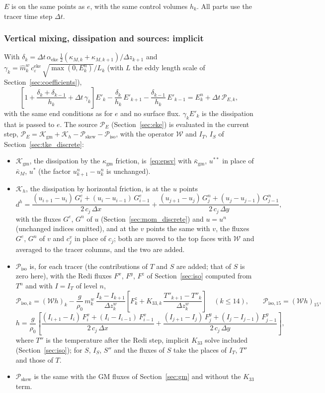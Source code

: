 \documentclass{article}
\begin{document}
$E$ is on the same points as $e$, with the same control volumes $h_k$. All parts use the tracer time step $\Delta t$.

\subsubsection*{Vertical mixing, dissipation and sources: implicit}
With $\delta_k = \Delta t\,\alpha_\text{eke}\,\tfrac12(\kappa_{M,k} + \kappa_{M,k+1})/\Delta z_{k+1}$ and $\gamma_k = \hat m^w_k\,c^\text{eke}_\varepsilon\,\sqrt{\max(0, E^n_k)}/L_k$ (with $L$ the eddy length scale of Section~\ref{sec:coefficients}),
\[
\left[ 1 + \frac{\delta_k + \delta_{k-1}}{h_k} + \Delta t\,\gamma_k \right] E'_k - \frac{\delta_k}{h_k}\,E'_{k+1} - \frac{\delta_{k-1}}{h_k}\,E'_{k-1}
= E^n_k + \Delta t\,\mathcal{P}_{E,k},
\]
with the same end conditions as for $e$ and no surface flux.
$\gamma_k E'_k$ is the dissipation that is passed to $e$.
The source $\mathcal{P}_E$ (Section~\ref{sec:eke}) is evaluated in the current step, $\mathcal{P}_E = \mathcal{K}_\text{gm} + \mathcal{K}_h - \mathcal{P}_\text{skew} - \mathcal{P}_\text{iso}$, with the operator $\mathcal{W}$ and $I_T$, $I_S$ of Section~\ref{sec:tke_discrete}:
\begin{itemize}
\item $\mathcal{K}_\text{gm}$, the dissipation by the $\kappa_\text{gm}$ friction, is~\eqref{eq:epsv} with $\bar\kappa_\text{gm}$, $u^{\ast\ast}$ in place of $\bar\kappa_M$, $u^\ast$ (the factor $u^n_{k+1}-u^n_k$ is unchanged).
\item $\mathcal{K}_h$, the dissipation by horizontal friction, is at the $u$ points
\[
d^h = \frac{(u_{i+1}-u_i)\,G^e_i + (u_i-u_{i-1})\,G^e_{i-1}}{2\,c_j\,\Delta x} + \frac{(u_{j+1}-u_j)\,G^n_j + (u_j-u_{j-1})\,G^n_{j-1}}{2\,c_j\,\Delta y},
\]
with the fluxes $G^e$, $G^n$ of $u$ (Section~\ref{sec:mom_discrete}) and $u = u^n$ (unchanged indices omitted), and at the $v$ points the same with $v$, the fluxes $G^e$, $G^n$ of $v$ and $c^v_j$ in place of $c_j$; both are moved to the top faces with $\mathcal{W}$ and averaged to the tracer columns, and the two are added.
\item $\mathcal{P}_\text{iso}$ is, for each tracer (the contributions of $T$ and $S$ are added; that of $S$ is zero here), with the Redi fluxes $F^x$, $F^y$, $F^z$ of Section~\ref{sec:iso} computed from $T^n$ and with $I = I_T$ of level $n$,
\[
\mathcal{P}_{\text{iso},k} = (\mathcal{W}h)_k - \frac{g}{\rho_0}\,m^w_k\,\frac{I_k - I_{k+1}}{\Delta z^w_k}\left[ F^z_k + K_{33,k}\,\frac{T''_{k+1} - T''_k}{\Delta z^w_k} \right] \quad (k \le 14),
\qquad
\mathcal{P}_{\text{iso},15} = (\mathcal{W}h)_{15},
\]
\[
h = \frac{g}{\rho_0}\left[ \frac{(I_{i+1}-I_i)\,F^x_i + (I_i-I_{i-1})\,F^x_{i-1}}{2\,c_j\,\Delta x} + \frac{(I_{j+1}-I_j)\,F^y_j + (I_j-I_{j-1})\,F^y_{j-1}}{2\,c_j\,\Delta y} \right],
\]
where $T''$ is the temperature after the Redi step, implicit $K_{33}$ solve included (Section~\ref{sec:iso}); for $S$, $I_S$, $S''$ and the fluxes of $S$ take the places of $I_T$, $T''$ and those of $T$.
\item $\mathcal{P}_\text{skew}$ is the same with the GM fluxes of Section~\ref{sec:gm} and without the $K_{33}$ term.
\end{itemize}
\end{document}
